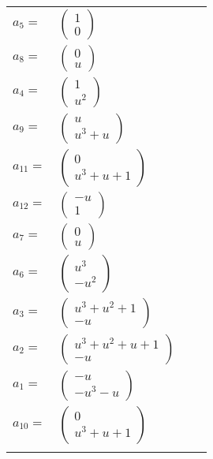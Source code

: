 \documentclass[1p]{elsarticle_modified}
\theoremstyle{definition}
\begin{document}
\begin{tabular}{m{7pt} m{180pt} m{7pt} m{180pt} }
\flushright $a_{5}=$&$\begin{pmatrix}1\\0\end{pmatrix}$ \\
\flushright $a_{8}=$&$\begin{pmatrix}0\\u\end{pmatrix}$ \\
\flushright $a_{4}=$&$\begin{pmatrix}1\\u^2\end{pmatrix}$ \\
\flushright $a_{9}=$&$\begin{pmatrix}u\\u^3+u\end{pmatrix}$ \\
\flushright $a_{11}=$&$\begin{pmatrix}0\\u^3+u+1\end{pmatrix}$ \\
\flushright $a_{12}=$&$\begin{pmatrix}- u\\1\end{pmatrix}$ \\
\flushright $a_{7}=$&$\begin{pmatrix}0\\u\end{pmatrix}$ \\
\flushright $a_{6}=$&$\begin{pmatrix}u^3\\- u^2\end{pmatrix}$ \\
\flushright $a_{3}=$&$\begin{pmatrix}u^3+u^2+1\\- u\end{pmatrix}$ \\
\flushright $a_{2}=$&$\begin{pmatrix}u^3+u^2+u+1\\- u\end{pmatrix}$ \\
\flushright $a_{1}=$&$\begin{pmatrix}- u\\- u^3- u\end{pmatrix}$ \\
\flushright $a_{10}=$&$\begin{pmatrix}0\\u^3+u+1\end{pmatrix}$\\&\end{tabular}
\end{document}
